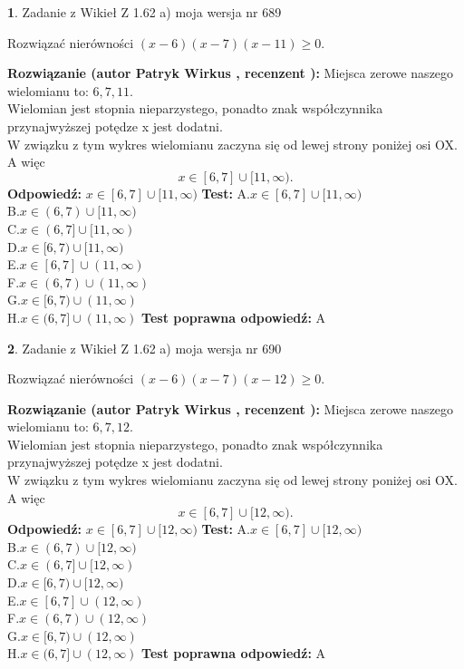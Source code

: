 \documentclass[12pt, a4paper]{article}
\theoremstyle{definition} %
\newtheorem{zad}{}
\newcommand{\zadStart}[1]{\begin{zad}#1\newline}
\newcommand{\zadStop}{\end{zad}}
\newcommand{\rozwStart}[2]{\noindent \textbf{Rozwiązanie (autor #1 , recenzent #2): }\newline}
\newcommand{\rozwStop}{\newline}
\newcommand{\odpStart}{\noindent \textbf{Odpowiedź:}\newline}
\newcommand{\odpStop}{\newline}
\newcommand{\testStart}{\noindent \textbf{Test:}\newline}
\newcommand{\testStop}{\newline}
\newcommand{\kluczStart}{\noindent \textbf{Test poprawna odpowiedź:}\newline}
\newcommand{\kluczStop}{\newline}
\begin{document}
\zadStart{Zadanie z Wikieł Z 1.62 a) moja wersja nr 689}

Rozwiązać nierówności $(x-6)(x-7)(x-11)\ge0$.
\zadStop
\rozwStart{Patryk Wirkus}{}
Miejsca zerowe naszego wielomianu to: $6, 7, 11$.\\
Wielomian jest stopnia nieparzystego, ponadto znak współczynnika przy\linebreak najwyższej potędze x jest dodatni.\\ W związku z tym wykres wielomianu zaczyna się od lewej strony poniżej osi OX. A więc $$x \in [6,7] \cup [11,\infty).$$
\rozwStop
\odpStart
$x \in [6,7] \cup [11,\infty)$
\odpStop
\testStart
A.$x \in [6,7] \cup [11,\infty)$\\
B.$x \in (6,7) \cup [11,\infty)$\\
C.$x \in (6,7] \cup [11,\infty)$\\
D.$x \in [6,7) \cup [11,\infty)$\\
E.$x \in [6,7] \cup (11,\infty)$\\
F.$x \in (6,7) \cup (11,\infty)$\\
G.$x \in [6,7) \cup (11,\infty)$\\
H.$x \in (6,7] \cup (11,\infty)$
\testStop
\kluczStart
A
\kluczStop



\zadStart{Zadanie z Wikieł Z 1.62 a) moja wersja nr 690}

Rozwiązać nierówności $(x-6)(x-7)(x-12)\ge0$.
\zadStop
\rozwStart{Patryk Wirkus}{}
Miejsca zerowe naszego wielomianu to: $6, 7, 12$.\\
Wielomian jest stopnia nieparzystego, ponadto znak współczynnika przy\linebreak najwyższej potędze x jest dodatni.\\ W związku z tym wykres wielomianu zaczyna się od lewej strony poniżej osi OX. A więc $$x \in [6,7] \cup [12,\infty).$$
\rozwStop
\odpStart
$x \in [6,7] \cup [12,\infty)$
\odpStop
\testStart
A.$x \in [6,7] \cup [12,\infty)$\\
B.$x \in (6,7) \cup [12,\infty)$\\
C.$x \in (6,7] \cup [12,\infty)$\\
D.$x \in [6,7) \cup [12,\infty)$\\
E.$x \in [6,7] \cup (12,\infty)$\\
F.$x \in (6,7) \cup (12,\infty)$\\
G.$x \in [6,7) \cup (12,\infty)$\\
H.$x \in (6,7] \cup (12,\infty)$
\testStop
\kluczStart
A
\kluczStop
\end{document}
